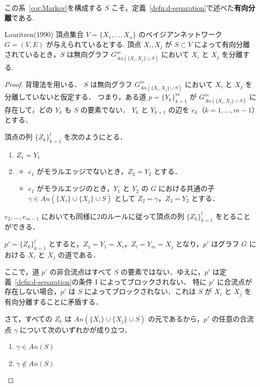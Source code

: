 \documentclass[uplatex, dvipdfmx]{jsarticle}
\begin{document}
この系~\ref{cor:Markov}を構成する $S$ こそ，定義~\ref{defn:d-separation}で述べた\textbf{有向分離}である.

\begin{thm}[label={thm:LauritzenForward}]{Lauritzen(1990)}
  頂点集合 $V = \{X_1, \dots, X_n\}$ のベイジアンネットワーク $G = (V, E)$ が与えられているとする.
  頂点 $X_i, X_j$ が $S \subset V$ によって有向分離されているとき，$S$ は無向グラフ $G^m_{An(\{X_i, X_j\} \cup S)}$ において $X_i$ と $X_j$ を分離する.
\end{thm}

\begin{proof}
  背理法を用いる．
  $S$ は無向グラフ $G^m_{An(\{X_i, X_j\} \cup S)}$ において $X_i$ と $X_j$ を分離していないと仮定する．
  つまり，ある道 $p = \{Y_k\}_{k=1}^m$ が $G^m_{An(\{X_i, X_j\} \cup S)}$ に存在して，どの $Y_k$ も $S$ の要素でない．
  $Y_k$ と $Y_{k+1}$ の辺を $e_k$（$k = 1, \dots, m-1$）とする．

  頂点の列 $\{Z_k\}_{k=1}^l$ を次のようにとる．
  \begin{enumerate}
    \item $Z_1 = Y_1$
    \item \begin{itemize}
      \item $e_1$ がモラルエッジでないとき，$Z_2 = Y_2$ とする．
      \item $e_1$ がモラルエッジのとき，$Y_1$ と $Y_2$ の $G$ における共通の子 $\gamma \in An(\{X_i\} \cup \{X_j\} \cup S)$ として $Z_2 = \gamma$，$Z_3 = Y_2$ とする．
    \end{itemize}
  \end{enumerate}
  $e_2, \dots, e_{m-1}$ においても同様に2のルールに従って頂点の列 $\{Z_k\}_{k=1}^l$ をとることができる．

  $p' = \{Z_k\}_{k=1}^l$ とすると，$Z_1 = Y_1 = X_i$，$Z_l = Y_m = X_j$ となり，$p'$ はグラフ $G$ における $X_i$ と $X_j$ の道である．

  ここで，道 $p'$ の非合流点はすべて $S$ の要素ではない．ゆえに，$p'$ は定義~\ref{defn:d-separation}の条件 I によってブロックされない．
  特に $p'$ に合流点が存在しない場合，$p'$ は $S$ によってブロックされない．これは $S$ が $X_i$ と $X_j$ を有向分離することに矛盾する．

  さて，すべての $Z_k$ は $An(\{X_i\} \cup \{X_j\} \cup S)$ の元であるから，$p'$ の任意の合流点 $\gamma$ について次のいずれかが成り立つ．
  \begin{enumerate}[label={(\roman*)}]
    \item $\gamma \in An(S)$
    \item $\gamma \notin An(S)$
  \end{enumerate}


\end{proof}
\end{document}
